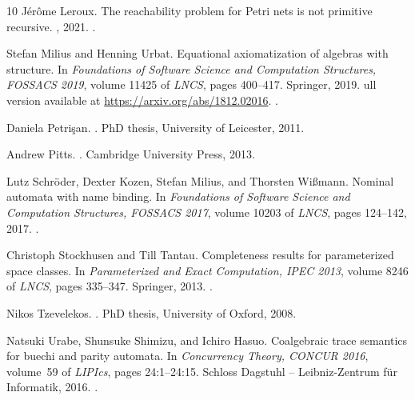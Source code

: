\documentclass[10pt,a4paper]{amsart}
\numberwithin{equation}{section}
\newcommand{\+}[1]{\mathcal{#1}\xspace}
\theoremstyle{definition}
\begin{document}
\begin{thebibliography}{10}
J{\'{e}}r{\^{o}}me Leroux.
\newblock The reachability problem for {P}etri nets is not primitive recursive.
, 2021.
\newblock \href {http://arxiv.org/abs/2104.12695} {}.

Stefan Milius and Henning Urbat.
\newblock Equational axiomatization of algebras with structure.
\newblock In {\em Foundations of Software Science and Computation Structures,
  {FOSSACS} 2019}, volume 11425 of {\em LNCS}, pages 400--417. Springer, 2019.
ull version available at \url{https://arxiv.org/abs/1812.02016}.
\newblock \href {http://dx.doi.org/10.1007/978-3-030-17127-8_23}
  {}.

Daniela Petri\c{s}an.
.
\newblock PhD thesis, University of Leicester, 2011.

Andrew Pitts.
.
\newblock Cambridge University Press, 2013.

Lutz Schr{\"{o}}der, Dexter Kozen, Stefan Milius, and Thorsten Wi{\ss}mann.
\newblock Nominal automata with name binding.
\newblock In {\em Foundations of Software Science and Computation Structures,
  {FOSSACS} 2017}, volume 10203 of {\em LNCS}, pages 124--142, 2017.
\newblock \href {http://dx.doi.org/10.1007/978-3-662-54458-7_8}
  {}.

Christoph Stockhusen and Till Tantau.
\newblock Completeness results for parameterized space classes.
\newblock In {\em Parameterized and Exact Computation, {IPEC} 2013}, volume
  8246 of {\em LNCS}, pages 335--347. Springer, 2013.
\newblock \href {http://dx.doi.org/10.1007/978-3-319-03898-8}
  {}.

Nikos Tzevelekos.
.
\newblock PhD thesis, University of Oxford, 2008.

Natsuki Urabe, Shunsuke Shimizu, and Ichiro Hasuo.
\newblock Coalgebraic trace semantics for buechi and parity automata.
\newblock In {\em Concurrency Theory, {CONCUR} 2016}, volume~59 of {\em
  LIPIcs}, pages 24:1--24:15. Schloss Dagstuhl -- Leibniz-Zentrum f{\"{u}}r
  Informatik, 2016.
\newblock \href {http://dx.doi.org/10.4230/LIPIcs.CONCUR.2016.24}
  {}.

\end{thebibliography}
\end{document}
